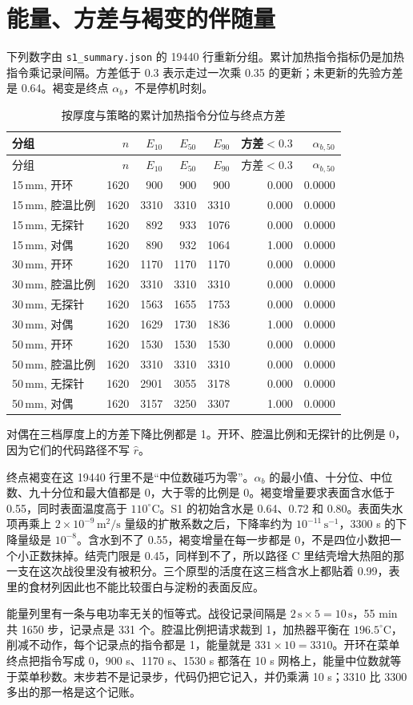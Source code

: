 \section{能量、方差与褐变的伴随量}
下列数字由 \texttt{s1\_summary.json} 的 19440 行重新分组。累计加热指令指标仍是加热指令乘记录间隔。方差低于 0.3 表示走过一次乘 0.35 的更新；未更新的先验方差是 0.64。褐变是终点 $\alpha_b$，不是停机时刻。
\begin{longtable}{lrrrrrr}
\caption{按厚度与策略的累计加热指令分位与终点方差}\\
\toprule
分组 & $n$ & $E_{10}$ & $E_{50}$ & $E_{90}$ & 方差$<0.3$ & $\alpha_{b,50}$ \\
\midrule\endfirsthead
\toprule 分组 & $n$ & $E_{10}$ & $E_{50}$ & $E_{90}$ & 方差$<0.3$ & $\alpha_{b,50}$ \\\midrule\endhead
15\,mm, 开环 & 1620 & 900 & 900 & 900 & 0.000 & 0.0000 \\
15\,mm, 腔温比例 & 1620 & 3310 & 3310 & 3310 & 0.000 & 0.0000 \\
15\,mm, 无探针 & 1620 & 892 & 933 & 1076 & 0.000 & 0.0000 \\
15\,mm, 对偶 & 1620 & 890 & 932 & 1064 & 1.000 & 0.0000 \\
30\,mm, 开环 & 1620 & 1170 & 1170 & 1170 & 0.000 & 0.0000 \\
30\,mm, 腔温比例 & 1620 & 3310 & 3310 & 3310 & 0.000 & 0.0000 \\
30\,mm, 无探针 & 1620 & 1563 & 1655 & 1753 & 0.000 & 0.0000 \\
30\,mm, 对偶 & 1620 & 1629 & 1730 & 1836 & 1.000 & 0.0000 \\
50\,mm, 开环 & 1620 & 1530 & 1530 & 1530 & 0.000 & 0.0000 \\
50\,mm, 腔温比例 & 1620 & 3310 & 3310 & 3310 & 0.000 & 0.0000 \\
50\,mm, 无探针 & 1620 & 2901 & 3055 & 3178 & 0.000 & 0.0000 \\
50\,mm, 对偶 & 1620 & 3157 & 3250 & 3307 & 1.000 & 0.0000 \\
\bottomrule\end{longtable}
对偶在三档厚度上的方差下降比例都是 1。开环、腔温比例和无探针的比例是 0，因为它们的代码路径不写 $\hat r$。

终点褐变在这 19440 行里不是“中位数碰巧为零”。$\alpha_b$ 的最小值、十分位、中位数、九十分位和最大值都是 0，大于零的比例是 0。褐变增量要求表面含水低于 0.55，同时表面温度高于 $110^\circ\mathrm{C}$。S1 的初始含水是 0.64、0.72 和 0.80。表面失水项再乘上 $2\times 10^{-9}\,\mathrm{m}^2/\mathrm{s}$ 量级的扩散系数之后，下降率约为 $10^{-11}\,\mathrm{s}^{-1}$，3300 s 的下降量级是 $10^{-8}$。含水到不了 0.55，褐变增量在每一步都是 0，不是四位小数把一个小正数抹掉。结壳门限是 0.45，同样到不了，所以路径 C 里结壳增大热阻的那一支在这次战役里没有被积分。三个原型的活度在这三档含水上都贴着 0.99，表里的食材列因此也不能比较蛋白与淀粉的表面反应。

能量列里有一条与电功率无关的恒等式。战役记录间隔是 $2\,\mathrm{s}\times 5=10\,\mathrm{s}$，55 min 共 1650 步，记录点是 331 个。腔温比例把请求裁到 1，加热器平衡在 $196.5^\circ\mathrm{C}$，削减不动作，每个记录点的指令都是 1，能量就是 $331\times 10=3310$。开环在菜单终点把指令写成 0，900 s、1170 s、1530 s 都落在 10 s 网格上，能量中位数就等于菜单秒数。末步若不是记录步，代码仍把它记入，并仍乘满 10 s；3310 比 3300 多出的那一格是这个记账。
